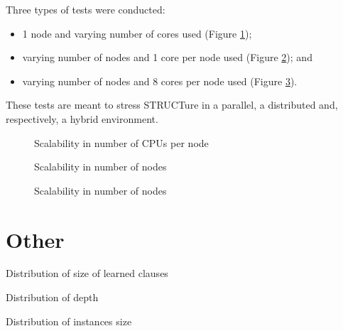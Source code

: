 Three types of tests were conducted:
\begin{itemize}
  \item 1 node and varying number of cores used (Figure \ref{fig:para-1X});
  \item varying number of nodes and 1 core per node used (Figure \ref{fig:para-X1}); and
  \item varying number of nodes and 8 cores per node used (Figure \ref{fig:para-X8}).
\end{itemize}
These tests are meant to stress STRUCTure in a parallel, a distributed
and, respectively, a hybrid environment.

\begin{figure}
  \centering
  \caption{Scalability in number of CPUs per node}
  \label{fig:para-1X}
\end{figure}

\begin{figure}
  \centering
  \caption{Scalability in number of nodes}
  \label{fig:para-X1}
\end{figure}

\begin{figure}
  \centering
  \caption{Scalability in number of nodes}
  \label{fig:para-X8}
\end{figure}
  



\section{Other}

Distribution of size of learned clauses 

Distribution of depth

Distribution of instances size
